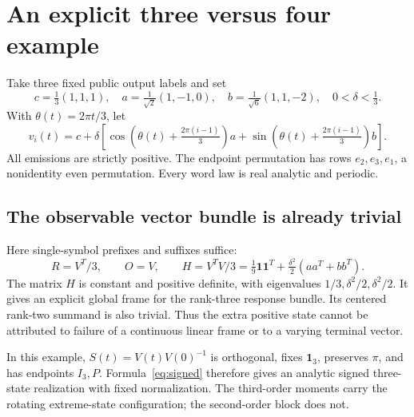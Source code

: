 \documentclass[11pt]{article}
\theoremstyle{definition}\newtheorem{definition}[theorem]{Definition}
\theoremstyle{remark}\newtheorem{remark}[theorem]{Remark}
\newcommand{\one}{\mathbf 1}
\begin{document}
\section{An explicit three versus four example}
Take three fixed public output labels and set
\[
 c=\tfrac13(1,1,1),\quad a=\tfrac1{\sqrt2}(1,-1,0),\quad
 b=\tfrac1{\sqrt6}(1,1,-2),\quad 0<\delta<\tfrac13.
\]
With $\theta(t)=2\pi t/3$, let
\begin{equation}\label{eq:triangle}
 v_i(t)=c+\delta\left[\cos\!\left(\theta(t)+\tfrac{2\pi(i-1)}3\right)a
 +\sin\!\left(\theta(t)+\tfrac{2\pi(i-1)}3\right)b\right].
\end{equation}
All emissions are strictly positive. The endpoint permutation has rows $e_2,e_3,e_1$, a nonidentity even permutation. Every word law is real analytic and periodic.

\subsection{The observable vector bundle is already trivial}
Here single-symbol prefixes and suffixes suffice:
\[
 R=V^T/3,\qquad O=V,\qquad
 H=V^TV/3=\tfrac19\one\one^T+\tfrac{\delta^2}{2}(aa^T+bb^T).
\]
The matrix $H$ is constant and positive definite, with eigenvalues $1/3,\delta^2/2,\delta^2/2$. It gives an explicit global frame for the rank-three response bundle. Its centered rank-two summand is also trivial. Thus the extra positive state cannot be attributed to failure of a continuous linear frame or to a varying terminal vector.

In this example, $S(t)=V(t)V(0)^{-1}$ is orthogonal, fixes $\one_3$, preserves $\pi$, and has endpoints $I_3,P$. Formula~\eqref{eq:signed} therefore gives an analytic signed three-state realization with fixed normalization. The third-order moments carry the rotating extreme-state configuration; the second-order block does not.
\end{document}
